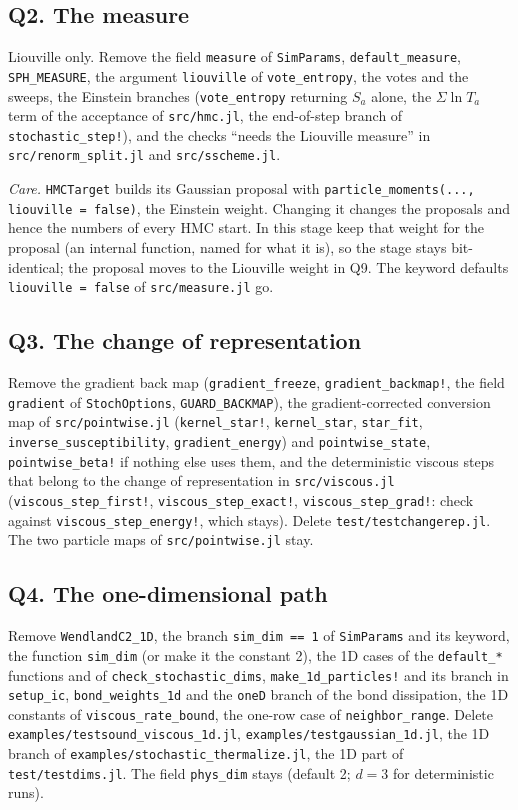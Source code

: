 \documentclass[11pt,aps,preprint,nofootinbib,superscriptaddress,tightenlines]{revtex4-2}
\begin{document}
\subsection*{Q2. The measure}
Liouville only.  Remove the field \texttt{measure} of \texttt{SimParams}, \texttt{default\_measure}, \texttt{SPH\_MEASURE}, the argument
\texttt{liouville} of \texttt{vote\_entropy}, the votes and the sweeps, the Einstein branches (\texttt{vote\_entropy} returning $S_a$ alone, the
$\Sigma\ln T_a$ term of the acceptance of \nolinkurl{src/hmc.jl}, the end-of-step branch of \texttt{stochastic\_step!}), and the checks ``needs
the Liouville measure'' in \nolinkurl{src/renorm_split.jl} and \nolinkurl{src/sscheme.jl}.

\emph{Care.}  \texttt{HMCTarget} builds its Gaussian proposal with \texttt{particle\_moments(..., liouville = false)}, the Einstein weight.
Changing it changes the proposals and hence the numbers of every HMC start.  In this stage keep that weight for the proposal (an internal
function, named for what it is), so the stage stays bit-identical; the proposal moves to the Liouville weight in Q9.  The keyword defaults
\texttt{liouville = false} of \nolinkurl{src/measure.jl} go.

\subsection*{Q3. The change of representation}
Remove the gradient back map (\texttt{gradient\_freeze}, \texttt{gradient\_backmap!}, the field \texttt{gradient} of \texttt{StochOptions},
\texttt{GUARD\_BACKMAP}), the gradient-corrected conversion map of \nolinkurl{src/pointwise.jl} (\texttt{kernel\_star!}, \texttt{kernel\_star},
\texttt{star\_fit}, \texttt{inverse\_susceptibility}, \texttt{gradient\_energy}) and \texttt{pointwise\_state}, \texttt{pointwise\_beta!} if
nothing else uses them, and the deterministic viscous steps that belong to the change of representation in \nolinkurl{src/viscous.jl}
(\texttt{viscous\_step\_first!}, \texttt{viscous\_step\_exact!}, \texttt{viscous\_step\_grad!}: check against \texttt{viscous\_step\_energy!},
which stays).  Delete \nolinkurl{test/testchangerep.jl}.  The two particle maps of \nolinkurl{src/pointwise.jl} stay.

\subsection*{Q4. The one-dimensional path}
Remove \texttt{WendlandC2\_1D}, the branch \texttt{sim\_dim == 1} of \texttt{SimParams} and its keyword, the function \texttt{sim\_dim} (or make it
the constant 2), the 1D cases of the \texttt{default\_*} functions and of \texttt{check\_stochastic\_dims}, \texttt{make\_1d\_particles!} and its
branch in \texttt{setup\_ic}, \texttt{bond\_weights\_1d} and the \texttt{oneD} branch of the bond dissipation, the 1D constants of
\texttt{viscous\_rate\_bound}, the one-row case of \texttt{neighbor\_range}.  Delete \nolinkurl{examples/testsound_viscous_1d.jl},
\nolinkurl{examples/testgaussian_1d.jl}, the 1D branch of \nolinkurl{examples/stochastic_thermalize.jl}, the 1D part of
\nolinkurl{test/testdims.jl}.  The field \texttt{phys\_dim} stays (default 2; $d=3$ for deterministic runs).
\end{document}
